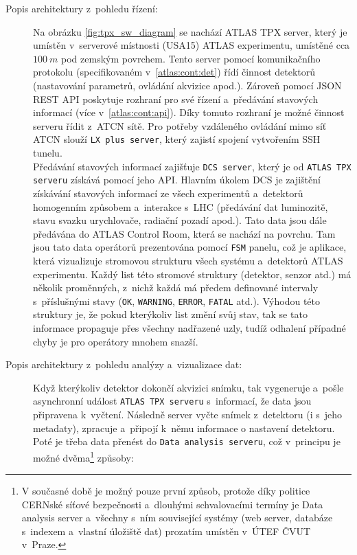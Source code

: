 \begin{description}
	\item[Popis architektury z~pohledu řízení:] 
		Na obrázku \ref{fig:tpx_sw_diagram} se nachází ATLAS TPX server, který je umístěn v~serverové místnosti (USA15) ATLAS experimentu, umístěné cca $100~m$ pod zemským povrchem. Tento server pomocí komunikačního protokolu (specifikovaném v~\ref{atlas:cont:det}) řídí činnost detektorů (nastavování parametrů, ovládání akvizice apod.). Zároveň pomocí JSON REST API poskytuje rozhraní pro své řízení a~předávání stavových informací (více v~\ref{atlas:cont:api}). Díky tomuto rozhraní je možné činnost serveru řídit z~ATCN sítě. Pro potřeby vzdáleného ovládání mimo síť ATCN slouží \texttt{LX plus server}, který zajistí spojení vytvořením SSH tunelu.\\
		Předávání stavových informací zajišťuje \texttt{DCS server}, který je od \texttt{ATLAS TPX serveru} získává pomocí jeho API. Hlavním úkolem DCS je zajištění získávání stavových informací ze všech experimentů a~detektorů homogenním způsobem a~interakce s~LHC (předávání dat luminozitě, stavu svazku urychlovače, radiační pozadí apod.). Tato data jsou dále předávána do ATLAS Control Room, která se nachází na povrchu. Tam jsou tato data operátorů prezentována pomocí \texttt{FSM} panelu, což je aplikace, která vizualizuje stromovou strukturu všech systému a~detektorů ATLAS experimentu. Každý list této stromové struktury (detektor, senzor atd.) má několik proměnných, z~nichž každá má předem definované intervaly s~příslušnými stavy (\texttt{OK}, \texttt{WARNING}, \texttt{ERROR}, \texttt{FATAL} atd.). Výhodou této struktury je, že pokud kterýkoliv list změní svůj stav, tak se tato informace propaguje přes všechny nadřazené uzly, tudíž odhalení případné chyby je pro operátory mnohem snazší.
	\item[Popis architektury z~pohledu analýzy a~vizualizace dat:] 
		Když kterýkoliv detektor dokončí akvizici snímku, tak vygeneruje a~pošle asynchronní událost \texttt{ATLAS TPX serveru} s~informací, že data jsou připravena k~vyčtení. Následně server vyčte snímek z~detektoru (i s~jeho metadaty), zpracuje a~připojí k~němu informace o nastavení detektoru. Poté je třeba data přenést do \texttt{Data analysis serveru}, což v~principu je možné dvěma\footnote{V současné době je možný pouze první způsob, protože díky politice CERNské síťové bezpečnosti a~dlouhými schvalovacími termíny je Data analysis server a~všechny s~ním související systémy (web server, databáze s~indexem a~vlastní úložiště dat) prozatím umístěn v~ÚTEF ČVUT v~Praze.} způsoby:

\end{description}
